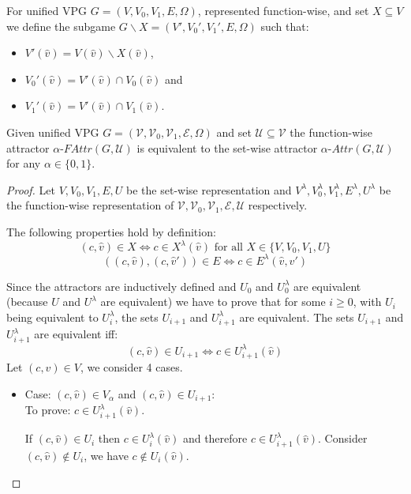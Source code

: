 \begin{definition}
	\label{def_Usubgame}
	For unified VPG $G = (V,V_0,V_1,E,\Omega)$, represented function-wise, and set $X \subseteq V$ we define the subgame $G \backslash X = (V',V_0',V_1',E,\Omega)$ such that:
	\begin{itemize}
		\item $V'(\hat{v}) = V(\hat{v}) \backslash X(\hat{v})$,
		\item $V_0'(\hat{v}) = V'(\hat{v}) \cap V_0(\hat{v})$ and
		\item $V_1'(\hat{v}) = V'(\hat{v}) \cap V_1(\hat{v})$.
	\end{itemize}
\end{definition}

\begin{lemma}
	\label{lem_attr_equal}
	Given unified VPG $G = (\mathcal{V},\mathcal{V}_0,\mathcal{V}_1, \mathcal{E}, \Omega)$ and set $\mathcal{U} \subseteq \mathcal{V}$ the function-wise attractor $\alpha\textit{-FAttr}(G,\mathcal{U})$ is equivalent to the set-wise attractor $\alpha\textit{-Attr}(G,\mathcal{U})$ for any $\alpha \in \{0,1\}$.
	\begin{proof}
		Let $V,V_0,V_1,E,U$ be the set-wise representation and $V^\lambda,V_0^\lambda,V_1^\lambda,E^\lambda,U^\lambda$ be the function-wise representation of $\mathcal{V},\mathcal{V}_0,\mathcal{V}_1,\mathcal{E},\mathcal{U}$ respectively.
		
		The following properties hold by definition:
		\[ (c,\hat{v}) \in X \iff c \in X^\lambda(\hat{v})\text{ for all } X\in \{V,V_0,V_1,U\}\]
		\[ ((c,\hat{v}),(c,\hat{v}')) \in E \iff c \in E^\lambda(\hat{v},\hat{v}') \]
		
		Since the attractors are inductively defined and $U_0$ and $U^\lambda_0$ are equivalent (because $U$ and $U^\lambda$ are equivalent) we have to prove that for some $i \geq 0$, with $U_i$ being equivalent to $U^\lambda_i$, the sets $U_{i+1}$ and $U^\lambda_{i+1}$ are equivalent. The sets $U_{i+1}$ and $U^\lambda_{i+1}$ are equivalent iff:
		\[ (c,\hat{v}) \in U_{i+1} \iff c \in U^\lambda_{i+1}(\hat{v}) \]
		Let $(c,\hat{v}) \in V$, we consider 4 cases.
		\begin{itemize}
			\item Case: $(c, \hat{v}) \in V_{\alpha}$ and $(c,\hat{v}) \in U_{i+1}$:\\
			To prove: $c \in U^\lambda_{i+1}(\hat{v})$.
			
			If $(c,\hat{v}) \in U_i$ then $c \in U^\lambda_i(\hat{v})$ and therefore $c \in U^\lambda_{i+1}(\hat{v})$. Consider $(c,\hat{v}) \notin U_i$, we have $c \notin U_i(\hat{v})$.
			

\end{itemize}
\end{proof}
\end{lemma}
